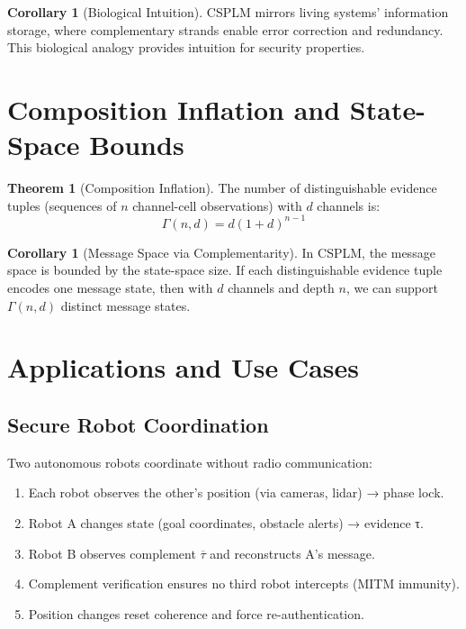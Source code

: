 \documentclass[11pt,a4paper]{article}
\theoremstyle{definition}
\newtheorem{theorem}[definition]{Theorem}
\newtheorem{corollary}[definition]{Corollary}
\newcommand{\comp}[1]{\overline{#1}}
\begin{document}
\begin{corollary}[Biological Intuition]
CSPLM mirrors living systems' information storage, where complementary strands enable error correction and redundancy. This biological analogy provides intuition for security properties.
\end{corollary}

\section{Composition Inflation and State-Space Bounds}

\begin{theorem}[Composition Inflation]
The number of distinguishable evidence tuples (sequences of $n$ channel-cell observations) with $d$ channels is:
\[
\Gamma(n, d) = d(1 + d)^{n-1}
\]
\end{theorem}

\begin{corollary}[Message Space via Complementarity]
In CSPLM, the message space is bounded by the state-space size. If each distinguishable evidence tuple encodes one message state, then with $d$ channels and depth $n$, we can support $\Gamma(n, d)$ distinct message states.
\end{corollary}

\section{Applications and Use Cases}
\label{sec:applications}

\subsection{Secure Robot Coordination}

Two autonomous robots coordinate without radio communication:
\begin{enumerate}
\item Each robot observes the other's position (via cameras, lidar) → phase lock.
\item Robot A changes state (goal coordinates, obstacle alerts) → evidence τ.
\item Robot B observes complement $\comp{\tau}$ and reconstructs A's message.
\item Complement verification ensures no third robot intercepts (MITM immunity).
\item Position changes reset coherence and force re-authentication.
\end{enumerate}
\end{document}
